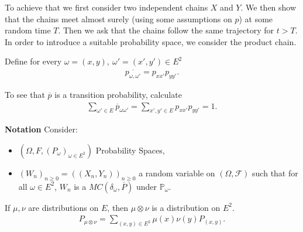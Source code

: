 To achieve that we first consider two independent chains $X$ and $Y$. We then show that the chains meet almost surely (using some assumptions on $p$) at some random time $T$. Then we ask that the chains follow the same trajectory for $t>T$. In order to introduce a suitable probability space, we consider the product chain.

\begin{defn}
	Define for every $\omega=(x,y), \ \omega'=(x',y') \in E^2$ 
	\begin{align}
	\boxed{\overline{p_{\omega, \omega'}}=p_{xx'}p_{yy'} }.
	\end{align}
\end{defn}
\begin{rmk}[]
	To see that $\overline{p}$ is a transition probability, calculate
	\begin{align}
		\sum_{\omega'\in E}^{} \overline{p}_{\omega \omega'} = \sum_{x',y' \in E}^{} p_{xx'}p_{yy'} = 1. 
	\end{align}
\end{rmk}


\noindent
\textbf{Notation} Consider:
\begin{itemize}
	\item $(\Omega, F, (P_\omega)_{\omega \in E^2})$ Probability Spaces,
	\item $(W_n)_{n\geq 0}=((X_n,Y_n))_{n\geq 0}$ a random variable on $(\Omega, \mathcal{F})$ such that for all $\omega \in E^2$, $W_n$ is a $MC(\delta_\omega, \overline{P})$ under $\mathbb{P}_{\omega}$.
\end{itemize}

\begin{rmk}[]
	If $\mu, \nu $ are distributions on $E$, then $\mu \otimes \nu $ is a distribution on $E^2$.
	\begin{align}
		\boxed{P_{\mu \otimes \nu }= \sum_{(x,y)\in E^2}^{}\mu (x) \nu (y) P_{(x,y)}}.
	\end{align}
	
\end{rmk}

